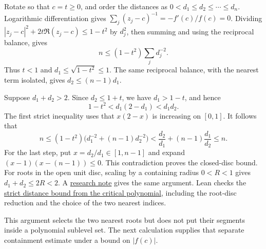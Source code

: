 \documentclass[11pt]{article}
\begin{document}
Rotate so that $c=t\ge0$, and order the distances
as $0<d_1\le d_2\le\cdots\le d_n$. Logarithmic differentiation gives
$\sum_j(z_j-c)^{-1}=-f'(c)/f(c)=0$. Dividing
$|z_j-c|^2+2t\Re(z_j-c)\le1-t^2$ by $d_j^2$, then summing and using
the reciprocal balance, gives
\[
 n\le(1-t^2)\sum_jd_j^{-2}.
\]
Thus $t<1$ and $d_1\le\sqrt{1-t^2}\le1$. The same reciprocal balance,
with the nearest term isolated, gives $d_2\le(n-1)d_1$.

Suppose $d_1+d_2>2$. Since $d_2\le1+t$, we have $d_1>1-t$, and hence
\[
 1-t^2<d_1(2-d_1)<d_1d_2.
\]
The first strict inequality uses that $x(2-x)$ is increasing on $[0,1]$.
It follows that
\[
 n\le(1-t^2)\bigl(d_1^{-2}+(n-1)d_2^{-2}\bigr)
 <\frac{d_2}{d_1}+(n-1)\frac{d_1}{d_2}\le n.
\]
For the last step, put $x=d_2/d_1\in[1,n-1]$ and expand
$(x-1)(x-(n-1))\le0$. This contradiction proves the closed-disc bound.
For roots in the open unit disc, scaling by a containing radius
$0<R<1$ gives $d_1+d_2\le2R<2$.
A
\href{https://github.com/wcook04/plectis-erdos/blob/a729f05c40398663fd586c9da487ad874d898639/research_corpus/Erdos1041/GlobalCriticalTwoNearestBudget.md}{research note} gives the same argument. Lean checks the \href{https://github.com/wcook04/plectis-erdos/blob/52d6c45ad203ba619cb5fe6ba485c0b5400519ea/lean/ErdosProblems/Erdos1041/PaperCompleteR20/TwoNearestPolynomial.lean\#L31}{strict distance bound from the critical polynomial}, including the root-disc reduction and the choice of the two nearest indices.

This argument selects the two nearest roots but does not put their
segments inside a polynomial sublevel set. The next calculation supplies
that separate containment estimate under a bound on $|f(c)|$.
\end{document}
